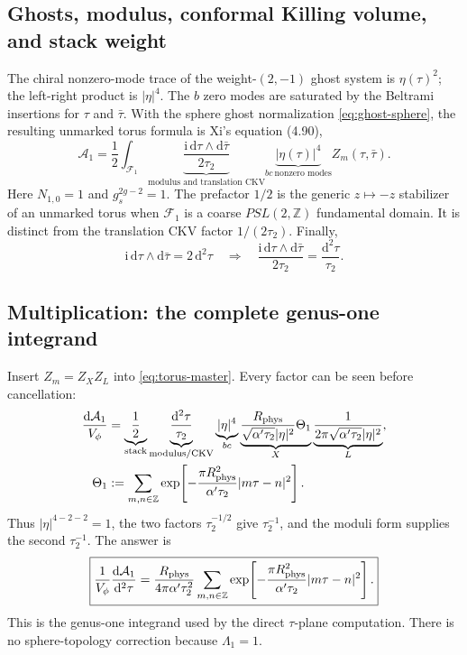 \documentclass[11pt]{article}
\numberwithin{equation}{section}
\newcommand{\A}{\alpha'}
\newcommand{\dd}{\mathrm d}
\newcommand{\ii}{\mathrm i}
\newcommand{\cA}{\mathcal A}
\newcommand{\cF}{\mathcal F}
\begin{document}
\subsection{Ghosts, modulus, conformal Killing volume, and stack weight}

The chiral nonzero-mode trace of the weight-$(2,-1)$ ghost system is
$\eta(\tau)^2$; the left-right product is $|\eta|^4$.  The $b$ zero modes are
saturated by the Beltrami insertions for $\tau$ and $\bar\tau$.  With the
sphere ghost normalization \eqref{eq:ghost-sphere}, the resulting unmarked
torus formula is Xi's equation (4.90),
\begin{equation}
 \cA_1
 =\frac12\int_{\cF_1}
 \underbrace{\frac{\ii\,\dd\tau\wedge\dd\bar\tau}{2\tau_2}}
 _{\text{modulus and translation CKV}}
 \underbrace{|\eta(\tau)|^4}_{bc\ \text{nonzero modes}}
 Z_m(\tau,\bar\tau).
 \label{eq:torus-master}
\end{equation}
Here $N_{1,0}=1$ and $g_s^{2g-2}=1$.  The prefactor $1/2$ is the generic
$z\mapsto-z$ stabilizer of an unmarked torus when $\cF_1$ is a coarse
$PSL(2,\mathbb Z)$ fundamental domain.  It is distinct from the translation
CKV factor $1/(2\tau_2)$.  Finally,
\begin{equation}
 \ii\,\dd\tau\wedge\dd\bar\tau=2\,\dd^2\tau
 \quad\Longrightarrow\quad
 \frac{\ii\,\dd\tau\wedge\dd\bar\tau}{2\tau_2}
 =\frac{\dd^2\tau}{\tau_2}.
 \label{eq:torus-real-measure}
\end{equation}

\subsection{Multiplication: the complete genus-one integrand}

Insert $Z_m=Z_XZ_L$ into \eqref{eq:torus-master}.  Every factor can be seen
before cancellation:
\begin{align}
 \frac{\dd\cA_1}{V_\phi}
 &=\underbrace{\frac12}_{\rm stack}
 \underbrace{\frac{\dd^2\tau}{\tau_2}}_{\rm modulus/CKV}
 \underbrace{|\eta|^4}_{bc}
 \underbrace{\frac{R_{\rm phys}}
 {\sqrt{\A\tau_2}|\eta|^2}\Theta_1}_{X}
 \underbrace{\frac1{2\pi\sqrt{\A\tau_2}|\eta|^2}}_{L},
 \label{eq:genus1-factor-product}\\
 \Theta_1
 &:=\sum_{m,n\in\mathbb Z}
 \exp\!\left[-\frac{\pi R_{\rm phys}^2}{\A\tau_2}
 |m\tau-n|^2\right].
\end{align}
Thus $|\eta|^{4-2-2}=1$, the two factors $\tau_2^{-1/2}$ give
$\tau_2^{-1}$, and the moduli form supplies the second $\tau_2^{-1}$.  The
answer is
\begin{equation}
 \boxed{
 \frac1{V_\phi}\frac{\dd\cA_1}{\dd^2\tau}
 =\frac{R_{\rm phys}}{4\pi\A\tau_2^2}
 \sum_{m,n\in\mathbb Z}
 \exp\!\left[-\frac{\pi R_{\rm phys}^2}{\A\tau_2}
 |m\tau-n|^2\right].}
 \label{eq:torus-integrand}
\end{equation}
This is the genus-one integrand used by the direct $\tau$-plane computation.
There is no sphere-topology correction because $\Lambda_1=1$.
\end{document}
